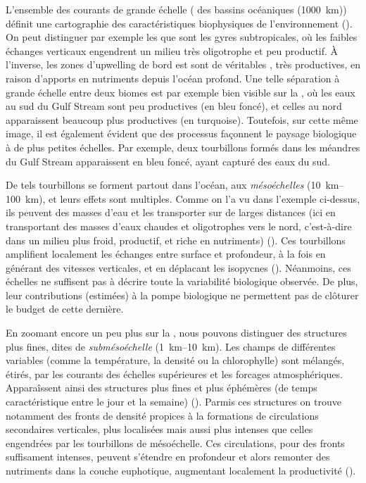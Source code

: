 L'ensemble des courants de grande échelle ( des bassins océaniques \OM(\qty{1000}{\km})) définit une cartographie des caractéristiques biophysiques de l'environnement (\cite{omand_2013,omand_2015a}).
On peut distinguer par exemple les  que sont les gyres subtropicales, où les faibles échanges verticaux engendrent un milieu très oligotrophe et peu productif.
À l'inverse, les zones d'upwelling de bord est sont de véritables , très productives, en raison d'apports en nutriments depuis l'océan profond.
Une telle séparation à grande échelle entre deux biomes est par exemple bien visible sur la , où les eaux au sud du Gulf Stream sont peu productives (en bleu foncé), et celles au nord apparaissent beaucoup plus productives (en turquoise).
Toutefois, sur cette même image, il est également évident que des processus façonnent le paysage biologique à de plus petites échelles.
Par exemple, deux tourbillons formés dans les méandres du Gulf Stream apparaissent en bleu foncé, ayant capturé des eaux du sud.

De tels tourbillons se forment partout dans l'océan, aux \emph{mésoéchelles} \OM(\qtyrange{10}{100}{\km}), et leurs effets sont multiples.
Comme on l'a vu dans l'exemple ci-dessus, ils peuvent  des masses d'eau et les transporter sur de larges distances (ici en transportant des masses d'eaux chaudes et oligotrophes vers le nord, c'est-à-dire dans un milieu plus froid, productif, et riche en nutriments) (\cite{lehahn_2011}).
Ces tourbillons amplifient localement les échanges entre surface et profondeur, à la fois en générant des vitesses verticales, et en déplacant les isopycnes (\cite{mcgillicuddy_1998}).
Néanmoins, ces échelles ne suffisent pas à décrire toute la variabilité biologique observée. De plus, leur contributions (estimées) à la pompe biologique ne permettent pas de clôturer le budget de cette dernière.

En zoomant encore un peu plus sur la , nous pouvons distinguer des structures plus fines, dites de \emph{submésoéchelle} \OM(\qtyrange{1}{10}{\km}).
Les champs de différentes variables (comme la température, la densité ou la chlorophylle) sont mélangés, étirés, par les courants des échelles supérieures et les forcages atmosphériques.
Apparaîssent ainsi des structures plus fines et plus éphémères (de temps caractéristique entre le jour et la semaine) (\cite{thomas_2008,mcwilliams_2016}).
Parmis ces structures on trouve notamment des fronts de densité propices à la formations de circulations secondaires verticales, plus localisées mais aussi plus intenses que celles engendrées par les tourbillons de mésoéchelle.
Ces circulations, pour des fronts suffisament intenses, peuvent s'étendre en profondeur et alors  remonter des nutriments dans la couche euphotique, augmentant localement la productivité (\cite{mahadevan_2016,levy_2018}).

